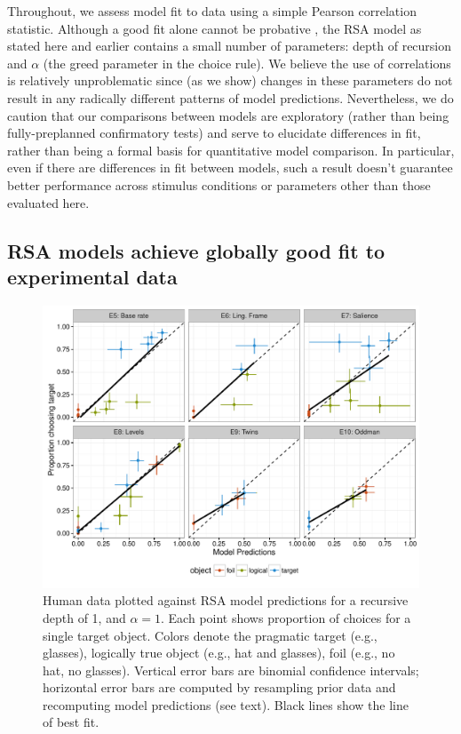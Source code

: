 \documentclass[man]{apa6}
\begin{document}
Throughout, we assess model fit to data using a simple Pearson correlation statistic. Although a good fit alone cannot be probative \cite{roberts2000}, the RSA model as stated here and earlier contains a small number of parameters: depth of recursion and $\alpha$ (the greed parameter in the choice rule). We believe the use of correlations is relatively unproblematic since (as we show) changes in these parameters do not result in any radically different patterns of model predictions. Nevertheless, we do caution that our comparisons between models are exploratory (rather than being fully-preplanned confirmatory tests) and serve to elucidate differences in fit, rather than being a formal basis for quantitative model comparison. In particular, even if there are differences in fit between models, such a result doesn't guarantee better performance across stimulus conditions or parameters other than those evaluated here.

\subsection{RSA models achieve globally good fit to experimental data}

\begin{figure}[t]
 \centering
 \includegraphics[width=6in]{../plots/model_basic.pdf}
 \caption{\label{fig:basic} Human data plotted against RSA model predictions for a recursive depth of 1, and $\alpha=1$. Each point shows proportion of choices for a single target object. Colors denote the pragmatic target (e.g., glasses), logically true object (e.g., hat and glasses), foil (e.g., no hat, no glasses). Vertical error bars are binomial confidence intervals; horizontal error bars are computed by resampling prior data and recomputing model predictions (see text). Black lines show the line of best fit.}
\end{figure}
\end{document}
